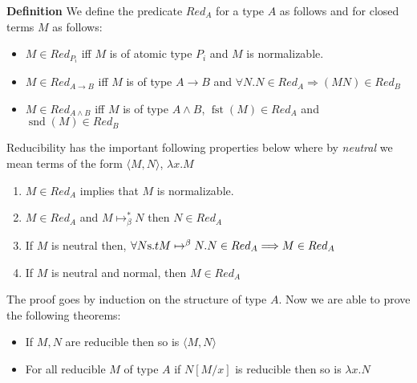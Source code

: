 \begin{mdframed}
	\textbf{Definition}
	We define the predicate $Red_A$ for a type $A$ as follows and for closed terms $M$ as follows:
	\begin{itemize}
		\item $M\in Red_{P_i}$ iff $M$ is of atomic type $P_i$  and $M$ is normalizable. 
		\item $M \in Red_{A\rightarrow B}$ iff $M$ is of type $A\rightarrow B$ and $\forall N. N \in Red_{A}\Longrightarrow (MN) \in Red_B$
		
		\item $M \in Red_{A\wedge B}$ iff $M$ is of type $A\wedge B$,  $\operatorname{fst}(M)\in Red_A$ and $\operatorname{snd}(M) \in Red_B$
		
	\end{itemize}
\end{mdframed}
Reducibility has the important following properties below where  by \textit{neutral} we mean terms of the form $\langle M, N \rangle$, $\lambda x. M$ 
\begin{theorem}
	\begin{enumerate}
		\item $M\in Red_A$ implies that $M$ is normalizable. 
		\item $M \in Red_A$ and $M\mapsto_\beta^{*} N$ then $N\in Red_A$
		\item If $M$ is neutral then,  $\forall N {\text s.t} M\mapsto^{\beta} N. N\in Red_A\Longrightarrow M \in Red_A $ 
		\item  If $M$ is neutral and normal, then $M \in Red_A$
	\end{enumerate}
\end{theorem}
The proof goes  by induction on the structure of type $A$.
Now we are able to prove the following theorems:

\begin{mdframed}
	\begin{theorem}
	\begin{itemize}
		\item If $M,N$ are reducible then so is $\langle M, N \rangle$
		\item For all reducible $M$ of type $A$ if $N[M/x]$ is reducible then so is $\lambda x. N$
	\end{itemize}

	\end{theorem}
	\end{mdframed}

